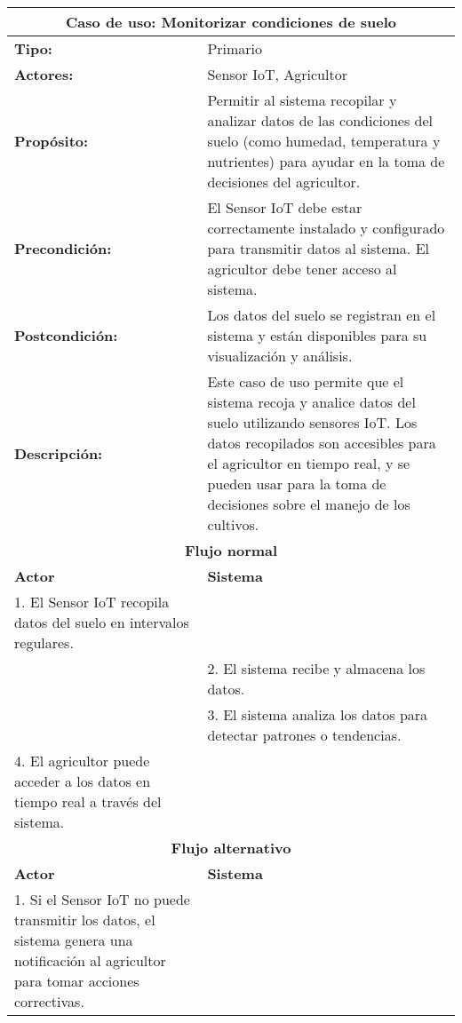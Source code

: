 \begin{longtable}{|p{5cm}|p{5cm}|}
	\hline
	\multicolumn{2}{|c|}{\textbf{Caso de uso: Monitorizar condiciones de suelo}} \\
	\hline
	\textbf{Tipo:} & Primario \\
	\hline
	\textbf{Actores:} & Sensor IoT, Agricultor \\
	\hline
	\textbf{Propósito:} & Permitir al sistema recopilar y analizar datos de las condiciones del suelo (como humedad, temperatura y nutrientes) para ayudar en la toma de decisiones del agricultor. \\
	\hline
	\textbf{Precondición:} & El Sensor IoT debe estar correctamente instalado y configurado para transmitir datos al sistema. El agricultor debe tener acceso al sistema. \\
	\hline
	\textbf{Postcondición:} & Los datos del suelo se registran en el sistema y están disponibles para su visualización y análisis. \\
	\hline
	\textbf{Descripción:} & Este caso de uso permite que el sistema recoja y analice datos del suelo utilizando sensores IoT. Los datos recopilados son accesibles para el agricultor en tiempo real, y se pueden usar para la toma de decisiones sobre el manejo de los cultivos. \\
	\hline
	\multicolumn{2}{|c|}{\textbf{Flujo normal}} \\
	\hline
	\textbf{Actor} & \textbf{Sistema} \\
	\hline
	1. El Sensor IoT recopila datos del suelo en intervalos regulares. & \\
	\hline
	& 2. El sistema recibe y almacena los datos. \\
	\hline
	& 3. El sistema analiza los datos para detectar patrones o tendencias. \\
	\hline
	4. El agricultor puede acceder a los datos en tiempo real a través del sistema. & \\
	\hline
	\multicolumn{2}{|c|}{\textbf{Flujo alternativo}} \\
	\hline
	\textbf{Actor} & \textbf{Sistema} \\
	\hline
	1. Si el Sensor IoT no puede transmitir los datos, el sistema genera una notificación al agricultor para tomar acciones correctivas. & \\
	\hline
\end{longtable}

